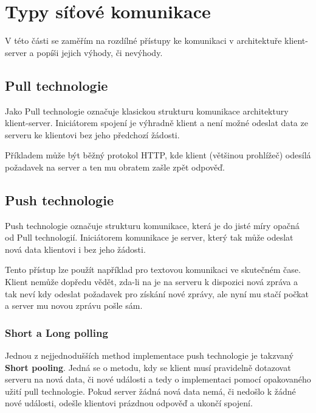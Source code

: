 
\section{Typy síťové komunikace}\label{sec:technologieProKomunikaciSeServerem}

V této části se zaměřím na rozdílné přístupy ke komunikaci v architektuře klient-server a popíši jejich výhody, či nevýhody.

\subsection{Pull technologie}\label{subsec:pullTechnologie}

Jako Pull technologie označuje klasickou strukturu komunikace architektury klient-server.
Iniciátorem spojení je výhradně klient a není možné odeslat data ze serveru ke klientovi bez jeho předchozí žádosti.

Příkladem může být běžný protokol \gls{HTTP}, kde klient (většinou prohlížeč) odesílá požadavek na server a ten mu obratem zašle zpět odpověď.~\cite{pushpull:about}

\subsection{Push technologie}\label{subsec:pushTechnologie}

Push technologie označuje strukturu komunikace, která je do jisté míry opačná od Pull technologií.
Iniciátorem komunikace je server, který tak může odeslat nová data klientovi i bez jeho žádosti.

Tento přístup lze použít například pro textovou komunikaci ve skutečném čase.
Klient nemůže dopředu vědět, zda-li na je na serveru k dispozici nová zpráva a tak neví kdy odeslat požadavek pro získání nové zprávy, ale nyní mu stačí počkat a server mu novou zprávu pošle sám.~\cite{pushpull:about}

\subsubsection{Short a Long polling}

Jednou z nejjednodušších method implementace push technologie je takzvaný \textbf{Short pooling}.
Jedná se o metodu, kdy se klient musí pravidelně dotazovat serveru na nová data, či nové události a tedy o implementaci pomocí opakovaného užití pull technologie.
Pokud server žádná nová data nemá, či nedošlo k žádné nové události, odešle klientovi prázdnou odpověď a ukončí spojení.

